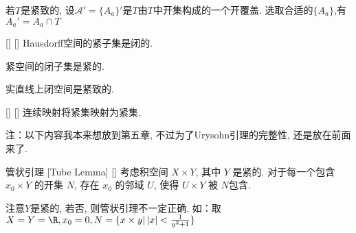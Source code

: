 \documentclass[UTF8]{ctexart}
\begin{document}
            \begin{prf}
                若\(T\)是紧致的, 设\(\mathcal{A}'=\{A_{a}\} '\)是\(T\)由\(T\)中开集构成的一个开覆盖. 选取合适的\(\{A_{a}\}\),有\(A_{a}'=A_{a}\cap T\)
            \end{prf}

            \begin{ppt}
                []
                {}
                []
                []
                Hausdorff空间的紧子集是闭的. 
                
                紧空间的闭子集是紧的.

                实直线上闭空间是紧致的. 
            \end{ppt}
            
            \begin{ppt}
                []
                {}
                []
                []
                连续映射将紧集映射为紧集. 
            \end{ppt}

            注：以下内容我本来想放到第五章, 不过为了Urysohn引理的完整性, 还是放在前面来了. 

            \begin{thm}
                []
                {管状引理}
                [Tube Lemma]
                []
                考虑积空间 \(X\times Y\), 其中 \(Y\) 是紧的. 对于每一个包含 \(x_0\times Y\) 的开集 \(N\), 存在 \(x_0\) 的邻域 \(U\), 使得 \(U\times Y\) 被 \(N\)包含. 

                注意\(Y\)是紧的, 若否, 则管状引理不一定正确. 如：取\(X=Y=\R,x_0=0,N=\{x\times y|\left|x\right|<\frac{1}{y^2+1}\}\)
            \end{thm}
\end{document}
